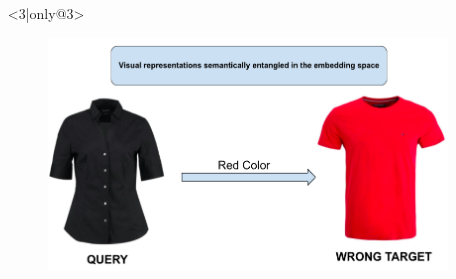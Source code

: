 \documentclass{beamer}
\begin{document}
\begin{frame}
\begin{columns}
\begin{itemize}
\begin{figure}[!h]
\begin{center}
 			\end{center}
 		\end{figure}
 	\item[] <3|only@3> 
		\begin{figure}[!h]
 			\begin{center}
 			\includegraphics[scale=0.22]{"Immagini/Wrong.png"}
 			\end{center}
 		\end{figure}
\end{itemize}
\end{columns}
\end{frame}
\end{document}
